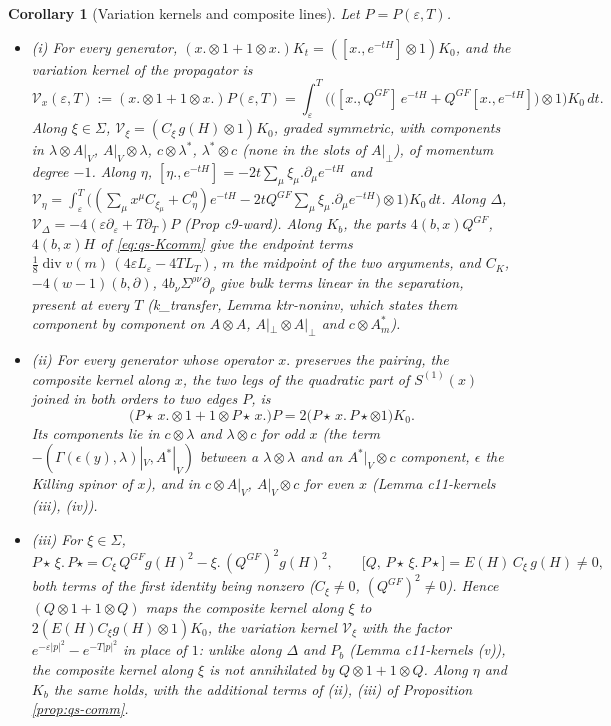 \documentclass[11pt]{article}
\numberwithin{equation}{section}
\theoremstyle{plain}
\newtheorem{corollary}[theorem]{Corollary}
\theoremstyle{definition}
\newcommand{\Ap}{A|_{\perp}}
\newcommand{\AV}{A|_V}
\begin{document}
\begin{corollary}[Variation kernels and composite lines]
\label{cor:qs-edges}
Let $P=P(\varepsilon,T)$.
\begin{itemize}
\item (i) For every generator, $(x.\otimes1+1\otimes x.)K_t=([x.,e^{-tH}]\otimes1)K_0$, and the variation kernel of the propagator is
\[
\mathcal V_x(\varepsilon,T):=(x.\otimes1+1\otimes x.)P(\varepsilon,T)=\int_\varepsilon^T\Big(\big([x.,Q^{GF}]\,e^{-tH}+Q^{GF}[x.,e^{-tH}]\big)\otimes1\Big)K_0\,dt .
\]
Along $\xi\in\Sigma$, $\mathcal V_\xi=(C_\xi\,g(H)\otimes1)K_0$, graded symmetric, with components in $\lambda\otimes A|_V$, $A|_V\otimes\lambda$, $c\otimes\lambda^*$, $\lambda^*\otimes c$ (none in the slots of $A|_\perp$), of momentum degree $-1$. Along $\eta$, $[\eta.,e^{-tH}]=-2t\sum_\mu\xi_\mu.\partial_\mu e^{-tH}$ and $\mathcal V_\eta=\int_\varepsilon^T\big((\sum_\mu x^\mu C_{\xi_\mu}+C^0_\eta)e^{-tH}-2tQ^{GF}\sum_\mu\xi_\mu.\partial_\mu e^{-tH}\big)\otimes1\big)K_0\,dt$. Along $\Delta$, $\mathcal V_\Delta=-4(\varepsilon\partial_\varepsilon+T\partial_T)P$ (Prop c9-ward). Along $K_b$, the parts $4(b,x)Q^{GF}$, $4(b,x)H$ of \eqref{eq:qs-Kcomm} give the endpoint terms $\tfrac18\operatorname{div}v(m)\,(4\varepsilon L_\varepsilon-4TL_T)$, $m$ the midpoint of the two arguments, and $C_K$, $-4(w-1)(b,\partial)$, $4b_\nu\Sigma^{\rho\nu}\partial_\rho$ give bulk terms linear in the separation, present at every $T$ (k\_transfer, Lemma ktr-noninv, which states them component by component on $A\otimes A$, $\Ap\otimes\Ap$ and $c\otimes A^*_m$).
\item (ii) For every generator whose operator $x.$ preserves the pairing, the composite kernel along $x$, the two legs of the quadratic part of $S^{(1)}(x)$ joined in both orders to two edges $P$, is
\[
\big(P\star\,x.\otimes1+1\otimes P\star\,x.\big)P=2\big(P\star\,x.\,P\star\otimes1\big)K_0 .
\]
Its components lie in $c\otimes\lambda$ and $\lambda\otimes c$ for odd $x$ (the term $-(\Gamma(\epsilon(y),\lambda)|_V,A^*|_V)$ between a $\lambda\otimes\lambda$ and an $A^*|_V\otimes c$ component, $\epsilon$ the Killing spinor of $x$), and in $c\otimes\AV$, $\AV\otimes c$ for even $x$ (Lemma c11-kernels (iii), (iv)).
\item (iii) For $\xi\in\Sigma$,
\[
P\star\,\xi.\,P\star=C_\xi\,Q^{GF}g(H)^2-\xi.\,(Q^{GF})^2g(H)^2,\qquad \big[Q,\,P\star\,\xi.\,P\star\big]=E(H)\,C_\xi\,g(H)\neq0 ,
\]
both terms of the first identity being nonzero ($C_\xi\neq0$, $(Q^{GF})^2\neq0$). Hence $(Q\otimes1+1\otimes Q)$ maps the composite kernel along $\xi$ to $2(E(H)C_\xi g(H)\otimes1)K_0$, the variation kernel $\mathcal V_\xi$ with the factor $e^{-\varepsilon|p|^2}-e^{-T|p|^2}$ in place of $1$: unlike along $\Delta$ and $P_b$ (Lemma c11-kernels (v)), the composite kernel along $\xi$ is not annihilated by $Q\otimes1+1\otimes Q$. Along $\eta$ and $K_b$ the same holds, with the additional terms of (ii), (iii) of Proposition \ref{prop:qs-comm}.

\end{itemize}
\end{corollary}
\end{document}
